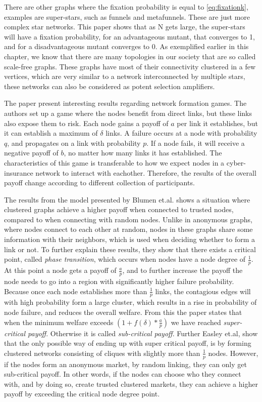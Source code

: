 There are other graphs where the fixation probability is equal to \ref{eq:fixationk}, examples are super-stars, such as funnels and
metafunnels. These are just more complex star networks. This paper shows that as N gets large, the super-stars will have a fixation probability, for an advantageous mutant, that converges to 1, and for a disadvantageous mutant converges to 0. 
As exemplified earlier in this chapter, we know that there are many
topologies in our society that are so called scale-free graphs. These graphs have most of their connectivity clustered in a few vertices, which are very similar to a network interconnected by multiple stars, these networks can also be considered as potent selection amplifiers. 


The paper \cite{contagion} present interesting results regarding network formation games. 
The authors set up a game where the nodes benefit from direct links, but these links also expose them to risk. 
Each node gains a payoff of $a$ per link it establishes, but it can establish a maximum of $\delta$ links.
A failure occurs at a node with probability $q$, and propagates on a link with probability $p$. If a node fails, it will receive a negative payoff of $b$, no matter how many links it has established. The characteristics of this game is transferable to how we expect nodes in a cyber-insurance network to interact with eachother. Therefore, the results of the overall payoff change according to different collection of participants. 

The results from the model presented by Blumen et.al. shows a situation where clustered graphs achieve a higher payoff when connected to trusted nodes, compared to when connecting with random nodes. Unlike in anonymous graphs, where nodes connect to each other at random, nodes in these graphs share some information with their neighbors, which is used when deciding whether to form a link or not. 
To further explain these results, they show that there exists a critical point, called \textit{phase transition}, which occurs when nodes have a node degree of $\frac{1}{p}$. 
At this point a node gets a payoff of $\frac{a}{p}$, and to further increase the payoff the node needs to go into a region with significantly higher failure probability. 
Because once each node establishes more than $\frac{1}{p}$ links, the contagious edges will with high probability form a large cluster, which results in a rise in probability of node failure, and reduces the overall welfare.
From this the paper states that when the minimum welfare exceeds 
$(1+f(\delta)*\frac{a}{p})$
we have reached \textit{super-critical payoff}. Otherwise it is called \textit{sub-critical payoff}. 
Further Easley et.al, show that the only possible way of ending up with super critical payoff, is by forming clustered networks consisting of cliques with slightly more than $\frac{1}{p}$ nodes. 
However, if the nodes form an anonymous market, by random linking, they can only get sub-critical payoff. 
In other words, if the nodes can choose who they connect with, and by doing so, create trusted clustered markets, they can achieve a higher payoff by exceeding the critical node degree point. 


